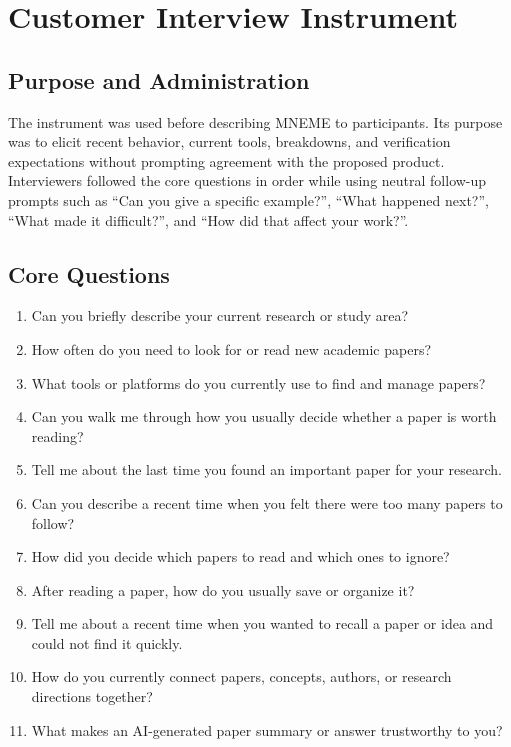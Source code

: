 
\chapter{Customer Interview Instrument}
\label{app:interview}

\section{Purpose and Administration}

The instrument was used before describing MNEME to participants.
Its purpose was to elicit recent behavior, current tools, breakdowns, and verification expectations without prompting agreement with the proposed product.
Interviewers followed the core questions in order while using neutral follow-up prompts such as ``Can you give a specific example?'', ``What happened next?'', ``What made it difficult?'', and ``How did that affect your work?''.

\section{Core Questions}

\begin{enumerate}
  \item Can you briefly describe your current research or study area?
  \item How often do you need to look for or read new academic papers?
  \item What tools or platforms do you currently use to find and manage papers?
  \item Can you walk me through how you usually decide whether a paper is worth reading?
  \item Tell me about the last time you found an important paper for your research.
  \item Can you describe a recent time when you felt there were too many papers to follow?
  \item How did you decide which papers to read and which ones to ignore?
  \item After reading a paper, how do you usually save or organize it?
  \item Tell me about a recent time when you wanted to recall a paper or idea and could not find it quickly.
  \item How do you currently connect papers, concepts, authors, or research directions together?
  \item What makes an AI-generated paper summary or answer trustworthy to you?
\end{enumerate}

